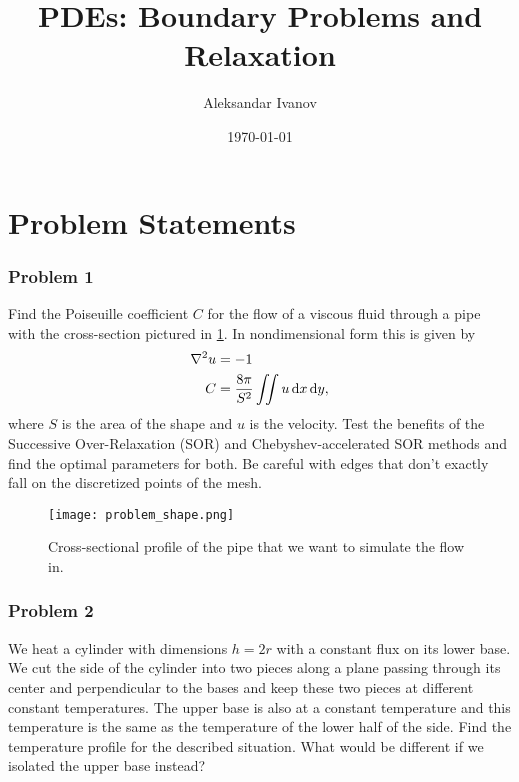 \documentclass[10pt,a4paper,twocolumn]{article}
\begin{document}
\title{PDEs: Boundary Problems and Relaxation}
\author{Aleksandar Ivanov}
\date{\today}
\maketitle

\section{Problem Statements}

\subsubsection*{Problem 1}
 
Find the Poiseuille coefficient $C$ for the flow of a viscous fluid through a pipe with the cross-section pictured in \cref{fig:problem_shape}. In nondimensional form this is given by
%
\begin{align}
    \nabla^2 u &= -1\\
    C &= \frac{8 \pi}{S^2} \iint u \dif x \dif y,
\end{align}
%
where $S$ is the area of the shape and $u$ is the velocity. Test the benefits of the Successive Over-Relaxation (SOR) and Chebyshev-accelerated SOR methods and find the optimal parameters for both. Be careful with edges that don't exactly fall on the discretized points of the mesh.

\begin{figure}[!h]
    \centering
    \texttt{[image: problem\_shape.png]}
    \caption{Cross-sectional profile of the pipe that we want to simulate the flow in.}
    \label{fig:problem_shape}
\end{figure}

\subsubsection*{Problem 2}

We heat a cylinder with dimensions $h=2r$ with a constant flux on its lower base. We cut the side of the cylinder into two pieces along a plane passing through its center and perpendicular to the bases and keep these two pieces at different constant temperatures. The upper base is also at a constant temperature and this temperature is the same as the temperature of the lower half of the side. Find the temperature profile for the described situation. What would be different if we isolated the upper base instead? 
\end{document}
